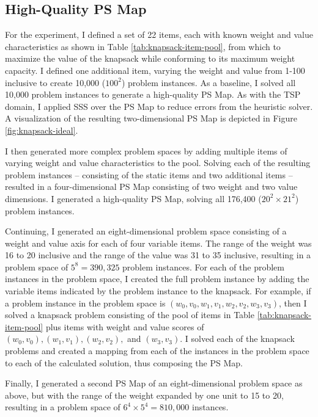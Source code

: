 \subsection{High-Quality PS Map} For the  experiment, I defined a set of 22 items, each with known weight and value characteristics as shown in Table \ref{tab:knapsack-item-pool}, from which to maximize the value of the knapsack while conforming to its maximum weight capacity.  I defined one additional item, varying the weight and value from 1-100 inclusive to create 10,000 ($\textrm{100}^{\textrm{2}}$) problem instances.  As a baseline, I solved all 10,000 problem instances to generate a high-quality PS Map.  As with the TSP domain, I applied SSS over the PS Map to reduce errors from the heuristic solver.  A visualization of the resulting two-dimensional PS Map is depicted in Figure \ref{fig:knapsack-ideal}.

I then generated more complex problem spaces  by adding multiple items of varying weight and value characteristics to the pool.  Solving each of the resulting problem instances -- consisting of the static items and two additional items -- resulted in a four-dimensional PS Map consisting of two weight and two value dimensions.  I generated a high-quality PS Map, solving all 176,400 ($20^2 \times 21^2$) problem instances.  

Continuing, I generated an eight-dimensional problem space consisting of a weight and value axis for each of four variable items.  The range of the weight was 16 to 20 inclusive and the range of the value was 31 to 35 inclusive, resulting in a problem space of $5^8 = 390,325$ problem instances.  For each of the problem instances in the problem space, I created the full problem instance by adding the variable items indicated by the problem instance to the knapsack.  For example, if a problem instance in the problem space is $(w_0,v_0,w_1,v_1,w_2,v_2,w_3,v_3)$, then I solved a knapsack problem consisting of the pool of items in Table \ref{tab:knapsack-item-pool} plus items with weight and value scores of $(w_0,v_0),(w_1,v_1),(w_2,v_2),$ and $(w_3,v_3)$.  I solved each of the knapsack problems and created a mapping from each of the instances in the problem space to each of the calculated solution, thus composing the PS Map.

Finally, I generated a second PS Map of an eight-dimensional problem space as above, but with the range of the weight expanded by one unit to 15 to 20, resulting in a problem space of $6^4 \times 5^4 = 810,000$ instances.

